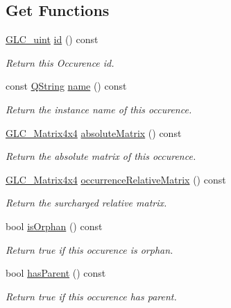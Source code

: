 \subsection*{Get Functions}
\begin{DoxyCompactItemize}
\item 
\hyperlink{glc__global_8h_abf950976fabed69026558df8e2da6c6b}{G\-L\-C\-\_\-uint} \hyperlink{class_g_l_c___struct_occurence_a55bc7161435b8e807ed7f315cc3da356}{id} () const 
\begin{DoxyCompactList}\small\item\em Return this Occurence id. \end{DoxyCompactList}\item 
const \hyperlink{group___u_a_v_objects_plugin_gab9d252f49c333c94a72f97ce3105a32d}{Q\-String} \hyperlink{class_g_l_c___struct_occurence_aecde0f1a741645cc4806c3f2c7f53e70}{name} () const 
\begin{DoxyCompactList}\small\item\em Return the instance name of this occurence. \end{DoxyCompactList}\item 
\hyperlink{class_g_l_c___matrix4x4}{G\-L\-C\-\_\-\-Matrix4x4} \hyperlink{class_g_l_c___struct_occurence_a4ff72c566eca78ed1e4ea6bac573bf21}{absolute\-Matrix} () const 
\begin{DoxyCompactList}\small\item\em Return the absolute matrix of this occurence. \end{DoxyCompactList}\item 
\hyperlink{class_g_l_c___matrix4x4}{G\-L\-C\-\_\-\-Matrix4x4} \hyperlink{class_g_l_c___struct_occurence_a4f661827fb296c0b463095a59cdd0ab3}{occurrence\-Relative\-Matrix} () const 
\begin{DoxyCompactList}\small\item\em Return the surcharged relative matrix. \end{DoxyCompactList}\item 
bool \hyperlink{class_g_l_c___struct_occurence_a35a1162346577367c8922477326a4b40}{is\-Orphan} () const 
\begin{DoxyCompactList}\small\item\em Return true if this occurence is orphan. \end{DoxyCompactList}\item 
bool \hyperlink{class_g_l_c___struct_occurence_ab936364375731b045b2e69e1aa0b51da}{has\-Parent} () const 
\begin{DoxyCompactList}\small\item\em Return true if this occurence has parent. \end{DoxyCompactList}\item 

\end{DoxyCompactItemize}
